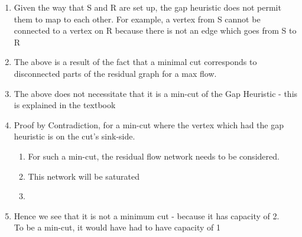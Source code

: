 \documentclass[11pt]{article}
\begin{document}
\begin{enumerate}
\begin{enumerate}
        \item Given the way that S and R are set up, the gap heuristic does not permit them to map to each other. For example, a vertex from S cannot be connected to a vertex on R because there is not an edge which goes from S to R
        \item The above is a result of the fact that a minimal cut corresponds to disconnected parts of the residual graph for a max flow.
        \item The above does not necessitate that it is a min-cut of the Gap Heuristic - this is explained in the textbook
        \item Proof by Contradiction, for a min-cut where the vertex which had the gap heuristic is on the cut's sink-side.
        \begin{enumerate}
            \item For such a min-cut, the residual flow network needs to be considered.
            \item This network will be saturated 
            \item 
        \end{enumerate}
        \item Hence we see that it is not a minimum cut - because it has capacity of 2.\\
        To be a min-cut, it would have had to have capacity of 1
    \end{enumerate}
    
\pagebreak


\end{enumerate}
\end{document}
